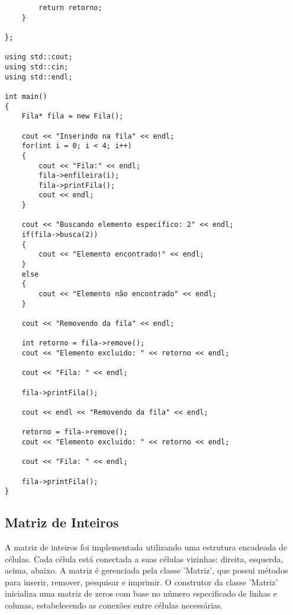 \documentclass{article}
\begin{document}
\begin{lstlisting}
        return retorno;
    }

};

using std::cout;
using std::cin;
using std::endl;

int main() 
{
    Fila* fila = new Fila();

    cout << "Inserindo na fila" << endl;
    for(int i = 0; i < 4; i++)
    {
        cout << "Fila:" << endl;    
        fila->enfileira(i);
        fila->printFila();
        cout << endl;
    }

    cout << "Buscando elemento específico: 2" << endl;
    if(fila->busca(2))
    {
        cout << "Elemento encontrado!" << endl;
    }
    else
    {
        cout << "Elemento não encontrado" << endl;
    }

    cout << "Removendo da fila" << endl;

    int retorno = fila->remove();
    cout << "Elemento excluido: " << retorno << endl;

    cout << "Fila: " << endl;

    fila->printFila(); 

    cout << endl << "Removendo da fila" << endl;

    retorno = fila->remove();
    cout << "Elemento excluido: " << retorno << endl;

    cout << "Fila: " << endl;

    fila->printFila();
}
\end{lstlisting}

\subsection{Matriz de Inteiros}
A matriz de inteiros foi implementada utilizando uma estrutura encadeada de células. Cada célula está conectada a suas células vizinhas: direita, esquerda, acima, abaixo. A matriz é gerenciada pela classe 'Matriz', que possui métodos para inserir, remover, pesquisar e imprimir. O construtor da classe 'Matriz' inicializa uma matriz de zeros com base no número especificado de linhas e colunas, estabelecendo as conexões entre células necessárias.
\end{document}
